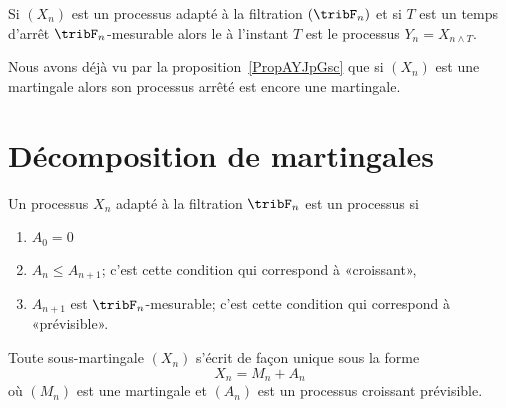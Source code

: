 \begin{definition}
    Si \( (X_n)\) est un processus adapté à la filtration \( (\tribF_n)\) et si \( T\) est un temps d'arrêt \( \tribF_n\)-mesurable alors le  à l'instant \( T\) est le processus \( Y_n=X_{n\wedge T}\).
\end{definition}
Nous avons déjà vu par la proposition~\ref{PropAYJpGsc} que si \( (X_n)\) est une martingale alors son processus arrêté est encore une martingale.

\section{Décomposition de martingales}

\begin{definition}
    Un processus \( X_n\) adapté à la filtration \( \tribF_n\) est un processus  si
    \begin{enumerate}
        \item
            \( A_0=0\)
        \item
            \( A_n\leq A_{n+1}\); c'est cette condition qui correspond à «croissant»,
        \item
            \( A_{n+1}\) est \( \tribF_n\)-mesurable; c'est cette condition qui correspond à «prévisible».
    \end{enumerate}
\end{definition}

\begin{proposition}
    Toute sous-martingale \( (X_n)\) s'écrit de façon unique sous la forme
    \begin{equation}\label{EqCCsAwbZ}
        X_n=M_n+A_n
    \end{equation}
    où \( (M_n)\) est une martingale et \( (A_n)\) est un processus croissant prévisible.
\end{proposition}

